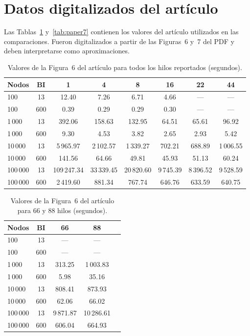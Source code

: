 \documentclass[11pt,a4paper,oneside]{article}
\begin{document}
\appendix
\section{Datos digitalizados del artículo}

Las Tablas~\ref{tab:paper6} y~\ref{tab:paper7} contienen los valores del artículo utilizados en las comparaciones. Fueron digitalizados a partir de las Figuras~6 y~7 del PDF y deben interpretarse como aproximaciones.

\begin{table}[H]
\caption{Valores de la Figura~6 del artículo para todos los hilos reportados (segundos).}
\label{tab:paper6}
\centering
\footnotesize
\setlength{\tabcolsep}{4pt}
\renewcommand{\arraystretch}{1.10}
\begin{tabular}{lccccccc}
\toprule
\rowcolor{tablehead}
\textbf{Nodos} & \textbf{BI} & \textbf{1} & \textbf{4} & \textbf{8} & \textbf{16} & \textbf{22} & \textbf{44} \\
\midrule
100     & 13  & 12.40 & 7.26 & 6.71 & 4.66 & --- & --- \\
100     & 600 & 0.39 & 0.29 & 0.29 & 0.30 & --- & --- \\
1\,000  & 13  & 392.06 & 158.63 & 132.95 & 64.51 & 65.61 & 96.92 \\
1\,000  & 600 & 9.30 & 4.53 & 3.82 & 2.65 & 2.93 & 5.42 \\
10\,000 & 13  & 5\,965.97 & 2\,102.57 & 1\,339.27 & 702.21 & 688.89 & 1\,006.55 \\
10\,000 & 600 & 141.56 & 64.66 & 49.81 & 45.93 & 51.13 & 60.24 \\
100\,000 & 13 & 109\,247.34 & 33\,339.45 & 20\,820.60 & 9\,745.39 & 8\,396.52 & 9\,528.59 \\
100\,000 & 600 & 2\,419.60 & 881.34 & 767.74 & 646.76 & 633.59 & 640.75 \\
\bottomrule
\end{tabular}
\end{table}

\begin{table}[H]
\caption{Valores de la Figura~6 del artículo para 66 y 88 hilos (segundos).}
\label{tab:paper6b}
\centering
\footnotesize
\setlength{\tabcolsep}{5pt}
\renewcommand{\arraystretch}{1.10}
\begin{tabular}{lcccc}
\toprule
\rowcolor{tablehead}
\textbf{Nodos} & \textbf{BI} & \textbf{66} & \textbf{88} \\
\midrule
100     & 13  & --- & --- \\
100     & 600 & --- & --- \\
1\,000  & 13  & 313.25 & 1\,003.83 \\
1\,000  & 600 & 5.98 & 35.16 \\
10\,000 & 13  & 808.41 & 873.93 \\
10\,000 & 600 & 62.06 & 66.02 \\
100\,000 & 13 & 9\,871.87 & 10\,286.61 \\
100\,000 & 600 & 606.04 & 664.93 \\
\bottomrule
\end{tabular}
\end{table}
\end{document}
